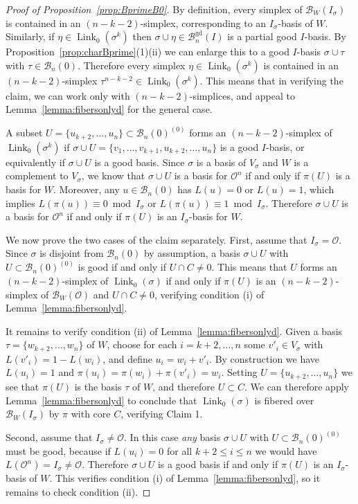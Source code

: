 \documentclass[11 pt]{article}
\theoremstyle{plain}
\theoremstyle{definition}
\numberwithin{equation}{section}
\renewcommand{\O}{\mathcal{O}}
\newcommand\PartialBases{\ensuremath{\mathcal{B}}}
\newcommand{\PB}{\PartialBases}
\newcommand{\PartialBasesGood}{\PartialBases^{\text{gd}}}
\newcommand{\PBg}{\PartialBasesGood}
\DeclareMathOperator{\Link}{Link}
\begin{document}
\begin{proof}[Proof of Proposition~\ref{prop:BprimeB0}]
By definition, every simplex of $\PB_W(I_\sigma)$ is contained in an $(n-k-2)$-simplex, corresponding to an $I_\sigma$-basis of $W$. Similarly, if $\eta\in \Link_0(\sigma^k)$ then $\sigma\cup\eta\in \PBg_n(I)$ is a partial good $I$-basis.  By Proposition~\ref{prop:charBprime}(1)(ii)  we can enlarge this to a good $I$-basis $\sigma\cup\tau$ with $\tau\in \PB_n(0)$. Therefore every simplex $\eta\in \Link_0(\sigma^k)$ is contained in an $(n-k-2)$-simplex $\tau^{n-k-2}\in \Link_0(\sigma^k)$. This means that in verifying the claim, we can work only with $(n-k-2)$-simplices, and appeal to Lemma~\ref{lemma:fibersonlyd} for the general case.

A subset $U=\{u_{k+2},\ldots,u_n\}\subset \PB_n(0)^{(0)}$ forms an $(n-k-2)$-simplex of $\Link_0(\sigma^k)$ if $\sigma\cup U=\{v_1,\ldots,v_{k+1}, u_{k+2},\ldots,u_n\}$ is a good $I$-basis, or equivalently if $\sigma\cup U$ is a good basis. Since $\sigma$ is a basis of $V_\sigma$ and $W$ is a complement to $V_\sigma$, we know that $\sigma\cup U$ is a basis for $\O^n$ if and only if $\pi(U)$ is a basis for $W$. Moreover, any $u\in \PB_n(0)$ has $L(u)=0$ or $L(u)=1$, which implies $L(\pi(u))\equiv 0\bmod{I_\sigma}$ or $L(\pi(u))\equiv 1\bmod{I_\sigma}$. Therefore $\sigma\cup U$ is a basis for $\O^n$ if and only if $\pi(U)$ is an $I_\sigma$-basis for $W$.

We now prove the two cases of the claim separately. First, assume that $I_\sigma=\O$. Since $\sigma$ is disjoint from $\PB_n(0)$ by assumption, a basis $\sigma\cup U$ with $U\subset \PB_n(0)^{(0)}$ is good if and only if $U\cap C\neq 0$. This means that $U$ forms an $(n-k-2)$-simplex of $\Link_0(\sigma)$ if and only if $\pi(U)$ is an $(n-k-2)$-simplex of $\PB_W(\O)$ and $U\cap C\neq 0$, verifying condition (i) of Lemma~\ref{lemma:fibersonlyd}.

It remains to verify condition (ii) of Lemma~\ref{lemma:fibersonlyd}. Given a basis $\tau=\{w_{k+2},\ldots,w_n\}$ of $W$, choose for each $i=k+2,\ldots,n$ some $v'_i\in V_\sigma$ with $L(v'_i)=1-L(w_i)$, and define $u_i=w_i+v'_i$. By construction we have $L(u_i)=1$ and $\pi(u_i)=\pi(w_i)+\pi(v'_i)=w_i$. Setting $U=\{u_{k+2},\ldots,u_n\}$ we see that $\pi(U)$ is the basis $\tau$ of $W$, and therefore $U\subset C$. We can therefore apply Lemma~\ref{lemma:fibersonlyd} to conclude that $\Link_0(\sigma)$ is  fibered over $\PB_W(I_\sigma)$ by $\pi$ with core $C$, verifying Claim 1.

Second, assume that $I_\sigma\neq \O$. In this case \emph{any} basis $\sigma\cup U$ with $U\subset \PB_n(0)^{(0)}$ must be good, because if $L(u_i)=0$ for all $k+2\leq i\leq n$ we would have $L(\O^n)=I_\sigma\neq \O$. Therefore $\sigma\cup U$ is a good basis if and only if $\pi(U)$ is an $I_\sigma$-basis of $W$. This verifies condition (i) of Lemma~\ref{lemma:fibersonlyd}, so it remains to check condition (ii).


\end{proof}
\end{document}

